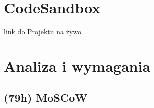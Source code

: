\documentclass[a4paper,11pt]{article}
\begin{document}
\maketitle
\section{CodeSandbox}
\href{https://codesandbox.io/p/github/adas77/panel/main}{link do Projektu na żywo}


\section{Analiza i wymagania}
\subsection{(79h) MoSCoW}
\end{document}
